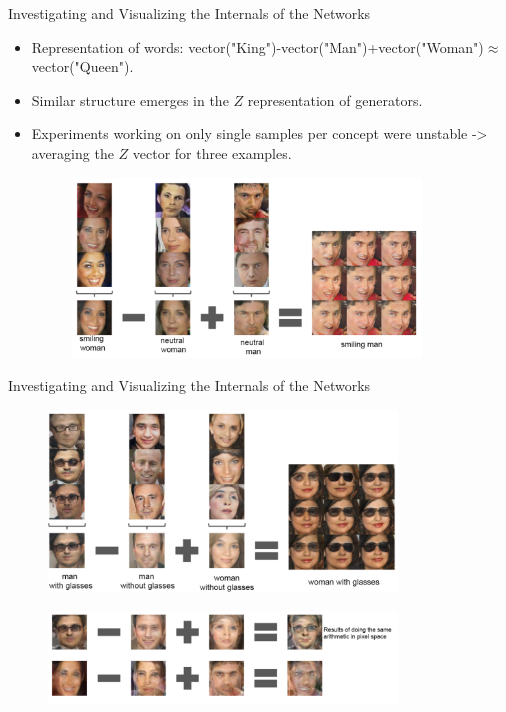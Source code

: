 \documentclass[10pt]{beamer}
\begin{document}
	\begin{frame}{Investigating and Visualizing the Internals of the Networks}
		\begin{itemize}
			\item Representation of words: vector("King")-vector("Man")+vector("Woman")$\approx$vector("Queen").
			\onslide<2->
			\item Similar structure emerges in the $Z$ representation of generators.
			\onslide<3->
			\item Experiments working on only single samples per concept were unstable -> averaging the $Z$ vector for three examples.
			\onslide<4->
			\begin{figure}
				\includegraphics<4->[width=25em]{figures/DCGAN-visualizing-internals-vector-1.PNG}
			\end{figure}
		\end{itemize}
	\end{frame}

	\begin{frame}{Investigating and Visualizing the Internals of the Networks}
		\begin{figure}
			\includegraphics[width=25em]{figures/DCGAN-visualizing-internals-vector-2.PNG}
		\end{figure}
		\begin{figure}
			\includegraphics[width=25em]{figures/DCGAN-visualizing-internals-vector-3.PNG}
		\end{figure}
	\end{frame}
\end{document}

